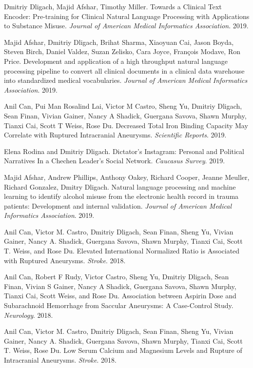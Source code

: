\documentclass[letterpaper]{article}
\renewenvironment{itemize}{
  \begin{list}{}{
    \setlength{\leftmargin}{1.5em}
  }
}{
  \end{list}
}
\begin{document}
\begin{itemize}
\item Dmitriy Dligach, Majid Afshar, Timothy Miller. Towards a Clinical Text Encoder: Pre-training for Clinical Natural Language Processing with Applications to Substance Misuse. \emph{Journal of American Medical Informatics Association}. 2019.
\item  Majid Afshar, Dmitriy Dligach, Brihat Sharma, Xiaoyuan Cai, Jason Boyda, Steven Birch, Daniel Valdez, Suzan Zelisko, Cara Joyce, François Modave, Ron Price. Development and application of a high throughput natural language processing pipeline to convert all clinical documents in a clinical data warehouse into standardized medical vocabularies. \emph{Journal of American Medical Informatics Association}. 2019.
\item Anil Can, Pui Man Rosalind Lai, Victor M Castro, Sheng Yu, Dmitriy Dligach, Sean Finan, Vivian Gainer, Nancy A Shadick, Guergana Savova, Shawn Murphy, Tianxi Cai, Scott T Weiss, Rose Du. Decreased Total Iron Binding Capacity May Correlate with Ruptured Intracranial Aneurysms. \emph{Scientific Reports}. 2019.
\item Elena Rodina and Dmitriy Dligach. Dictator's Instagram: Personal and Political Narratives In a Chechen Leader's Social Network. \emph{Caucasus Survey}. 2019.
\item Majid Afshar, Andrew Phillips, Anthony Oakey, Richard Cooper, Jeanne Meuller, Richard Gonzalez, Dmitry Dligach. Natural language processing and machine learning to identify alcohol misuse from the electronic health record in trauma patients: Development and internal validation. \emph{Journal of American Medical Informatics Association}. 2019.
\item Anil Can, Victor M. Castro, Dmitriy Dligach, Sean Finan, Sheng Yu, Vivian Gainer, Nancy A. Shadick, Guergana Savova, Shawn Murphy, Tianxi Cai, Scott T. Weiss, and Rose Du. Elevated International Normalized Ratio is Associated with Ruptured Aneurysms. \emph{Stroke}. 2018.
\item Anil Can, Robert F Rudy, Victor Castro, Sheng Yu, Dmitriy Dligach, Sean Finan, Vivian S Gainer, Nancy A Shadick, Guergana Savova, Shawn Murphy, Tianxi Cai, Scott Weiss, and Rose Du. Association between Aspirin Dose and Subarachnoid Hemorrhage from Saccular Aneurysms: A Case-Control Study. \emph{Neurology}. 2018.
\item Anil Can, Victor M. Castro, Dmitriy Dligach, Sean Finan, Sheng Yu, Vivian Gainer, Nancy A. Shadick, Guergana Savova, Shawn Murphy, Tianxi Cai, Scott T. Weiss, Rose Du. Low Serum Calcium and Magnesium Levels and Rupture of Intracranial Aneurysms. \emph{Stroke}. 2018.

\end{itemize}
\end{document}
